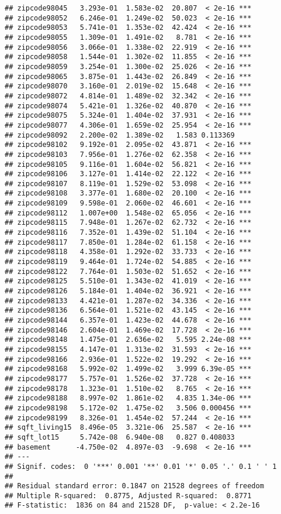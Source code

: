 \documentclass[]{article}
\begin{document}
\begin{verbatim}
## zipcode98045   3.293e-01  1.583e-02  20.807  < 2e-16 ***
## zipcode98052   6.246e-01  1.249e-02  50.023  < 2e-16 ***
## zipcode98053   5.741e-01  1.353e-02  42.424  < 2e-16 ***
## zipcode98055   1.309e-01  1.491e-02   8.781  < 2e-16 ***
## zipcode98056   3.066e-01  1.338e-02  22.919  < 2e-16 ***
## zipcode98058   1.544e-01  1.302e-02  11.855  < 2e-16 ***
## zipcode98059   3.254e-01  1.300e-02  25.026  < 2e-16 ***
## zipcode98065   3.875e-01  1.443e-02  26.849  < 2e-16 ***
## zipcode98070   3.160e-01  2.019e-02  15.648  < 2e-16 ***
## zipcode98072   4.814e-01  1.489e-02  32.342  < 2e-16 ***
## zipcode98074   5.421e-01  1.326e-02  40.870  < 2e-16 ***
## zipcode98075   5.324e-01  1.404e-02  37.931  < 2e-16 ***
## zipcode98077   4.306e-01  1.659e-02  25.954  < 2e-16 ***
## zipcode98092   2.200e-02  1.389e-02   1.583 0.113369    
## zipcode98102   9.192e-01  2.095e-02  43.871  < 2e-16 ***
## zipcode98103   7.956e-01  1.276e-02  62.358  < 2e-16 ***
## zipcode98105   9.116e-01  1.604e-02  56.821  < 2e-16 ***
## zipcode98106   3.127e-01  1.414e-02  22.122  < 2e-16 ***
## zipcode98107   8.119e-01  1.529e-02  53.098  < 2e-16 ***
## zipcode98108   3.377e-01  1.680e-02  20.100  < 2e-16 ***
## zipcode98109   9.598e-01  2.060e-02  46.601  < 2e-16 ***
## zipcode98112   1.007e+00  1.548e-02  65.056  < 2e-16 ***
## zipcode98115   7.948e-01  1.267e-02  62.732  < 2e-16 ***
## zipcode98116   7.352e-01  1.439e-02  51.104  < 2e-16 ***
## zipcode98117   7.850e-01  1.284e-02  61.158  < 2e-16 ***
## zipcode98118   4.358e-01  1.292e-02  33.733  < 2e-16 ***
## zipcode98119   9.464e-01  1.724e-02  54.885  < 2e-16 ***
## zipcode98122   7.764e-01  1.503e-02  51.652  < 2e-16 ***
## zipcode98125   5.510e-01  1.343e-02  41.019  < 2e-16 ***
## zipcode98126   5.184e-01  1.404e-02  36.921  < 2e-16 ***
## zipcode98133   4.421e-01  1.287e-02  34.336  < 2e-16 ***
## zipcode98136   6.564e-01  1.521e-02  43.145  < 2e-16 ***
## zipcode98144   6.357e-01  1.423e-02  44.678  < 2e-16 ***
## zipcode98146   2.604e-01  1.469e-02  17.728  < 2e-16 ***
## zipcode98148   1.475e-01  2.636e-02   5.595 2.24e-08 ***
## zipcode98155   4.147e-01  1.313e-02  31.593  < 2e-16 ***
## zipcode98166   2.936e-01  1.522e-02  19.292  < 2e-16 ***
## zipcode98168   5.992e-02  1.499e-02   3.999 6.39e-05 ***
## zipcode98177   5.757e-01  1.526e-02  37.728  < 2e-16 ***
## zipcode98178   1.323e-01  1.510e-02   8.765  < 2e-16 ***
## zipcode98188   8.997e-02  1.861e-02   4.835 1.34e-06 ***
## zipcode98198   5.172e-02  1.475e-02   3.506 0.000456 ***
## zipcode98199   8.326e-01  1.454e-02  57.244  < 2e-16 ***
## sqft_living15  8.496e-05  3.321e-06  25.587  < 2e-16 ***
## sqft_lot15     5.742e-08  6.940e-08   0.827 0.408033    
## basement      -4.750e-02  4.897e-03  -9.698  < 2e-16 ***
## ---
## Signif. codes:  0 '***' 0.001 '**' 0.01 '*' 0.05 '.' 0.1 ' ' 1
## 
## Residual standard error: 0.1847 on 21528 degrees of freedom
## Multiple R-squared:  0.8775, Adjusted R-squared:  0.8771 
## F-statistic:  1836 on 84 and 21528 DF,  p-value: < 2.2e-16
\end{verbatim}
\end{document}

